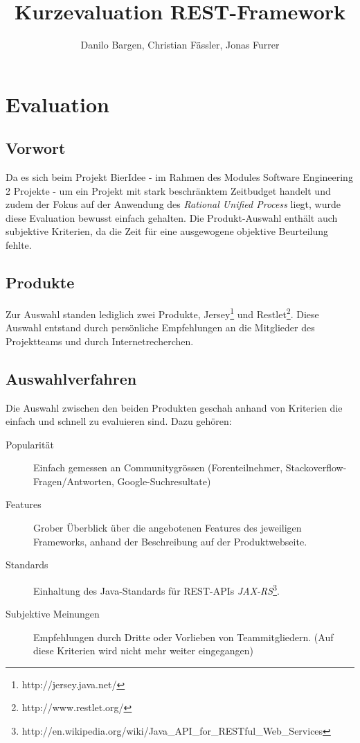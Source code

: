 \documentclass[10pt,a4paper]{scrartcl}
\author{Danilo Bargen, Christian Fässler, Jonas Furrer}
\title{Kurzevaluation REST-Framework}
\begin{document}
\begin{titlepage}
	\maketitle
	\vspace{120mm}
	\thispagestyle{empty} %
\end{titlepage}

\section{Evaluation}
\subsection{Vorwort}
Da es sich beim Projekt BierIdee - im Rahmen des Modules Software Engineering 2 Projekte - um ein Projekt mit stark beschränktem Zeitbudget handelt und zudem der Fokus auf der Anwendung des \textit{Rational Unified Process} liegt, wurde diese Evaluation bewusst einfach gehalten. Die Produkt-Auswahl enthält auch subjektive Kriterien, da die Zeit für eine ausgewogene objektive Beurteilung fehlte.

\subsection{Produkte}
Zur Auswahl standen lediglich zwei Produkte, Jersey\footnote{http://jersey.java.net/} und Restlet\footnote{http://www.restlet.org/}. Diese Auswahl entstand durch persönliche Empfehlungen an die Mitglieder des Projektteams und durch Internetrecherchen.

\subsection{Auswahlverfahren}
Die Auswahl zwischen den beiden Produkten geschah anhand von Kriterien die einfach und schnell zu evaluieren sind. Dazu gehören:

\begin{description}
	\item[Popularität]Einfach gemessen an Communitygrössen (Forenteilnehmer, Stackoverflow-Fragen/Antworten, Google-Suchresultate)
	\item[Features]Grober Überblick über die angebotenen Features des jeweiligen Frameworks, anhand der Beschreibung auf der Produktwebseite.
	\item[Standards] Einhaltung des Java-Standards für REST-APIs \textit{JAX-RS}\footnote{http://en.wikipedia.org/wiki/Java\_API\_for\_RESTful\_Web\_Services}.
	\item[Subjektive Meinungen] Empfehlungen durch Dritte oder Vorlieben von Teammitgliedern. (Auf diese Kriterien wird nicht mehr weiter eingegangen)
\end{description}
\end{document}
